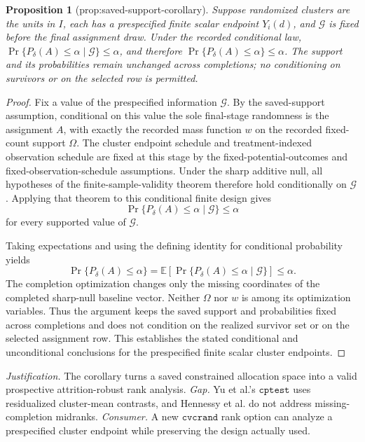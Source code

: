 \documentclass{article}
\newtheorem{proposition}{Proposition}
\begin{document}
\begin{proposition}[prop:saved-support-corollary]\label{prop:saved-support-corollary}
Suppose randomized clusters are the units in \(I\), each has a prespecified finite scalar endpoint \(Y_i(d)\), and \(\mathscr G\) is fixed before the final assignment draw. Under the recorded conditional law, \(\Pr\{P_\delta(A)\le\alpha\mid\mathscr G\}\le\alpha\), and therefore \(\Pr\{P_\delta(A)\le\alpha\}\le\alpha\). The support and its probabilities remain unchanged across completions; no conditioning on survivors or on the selected row is permitted.
\end{proposition}
\begin{proof}
Fix a value of the prespecified information \(\mathscr G\).  By the saved-support assumption, conditional on this value the sole final-stage randomness is the assignment \(A\), with exactly the recorded mass function \(w\) on the recorded fixed-count support \(\Omega\).  The cluster endpoint schedule and treatment-indexed observation schedule are fixed at this stage by the fixed-potential-outcomes and fixed-observation-schedule assumptions.  Under the sharp additive null, all hypotheses of the finite-sample-validity theorem therefore hold conditionally on \(\mathscr G\).  Applying that theorem to this conditional finite design gives
\[
\Pr\{P_\delta(A)\le\alpha\mid\mathscr G\}\le\alpha
\]
for every supported value of \(\mathscr G\).

Taking expectations and using the defining identity for conditional probability yields
\[
\Pr\{P_\delta(A)\le\alpha\}
=\mathbb E\!\left[
  \Pr\{P_\delta(A)\le\alpha\mid\mathscr G\}
 \right]
\le\alpha.
\]
The completion optimization changes only the missing coordinates of the completed sharp-null baseline vector.  Neither \(\Omega\) nor \(w\) is among its optimization variables.  Thus the argument keeps the saved support and probabilities fixed across completions and does not condition on the realized survivor set or on the selected assignment row.  This establishes the stated conditional and unconditional conclusions for the prespecified finite scalar cluster endpoints.
\end{proof}
\par\smallskip\noindent \textit{Justification.} The corollary turns a saved constrained allocation space into a valid prospective attrition-robust rank analysis. \textit{Gap.} Yu et al.'s \(\texttt{cptest}\) uses residualized cluster-mean contrasts, and Hennessy et al. do not address missing-completion midranks. \textit{Consumer.} A new \(\texttt{cvcrand}\) rank option can analyze a prespecified cluster endpoint while preserving the design actually used.
\end{document}

